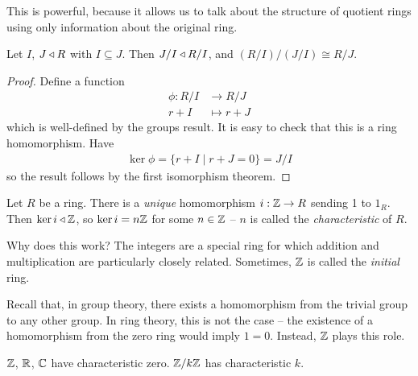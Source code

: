 \documentclass{../template/note}
\begin{document}
    \begin{remark*}
        This is powerful, because it allows us to talk about the structure of quotient rings using only information about the original ring.
    \end{remark*}
    
    \begin{theorem}
        Let $I$, $J \triangleleft R$ with $I \subseteq J$. Then $J/I \triangleleft R/I$, and $(R/I)/(J/I) \cong R/J$.
    \end{theorem}

    \begin{proof}
        Define a function
        \begin{align*}
            \phi: R/I &\to R/J \\
            r+I &\mapsto r+J
        \end{align*}
        which is well-defined by the groups result. It is easy to check that this is a ring homomorphism. Have
        \begin{align*}
            \ker \phi = \{r + I \mid r + J = 0\} = J/I
        \end{align*}
        so the result follows by the first isomorphism theorem.
    \end{proof}
    
    \begin{proposition}
        Let $R$ be a ring. There is a \emph{unique} homomorphism $i: \mathbb Z \to R$ sending 1 to $1_R$. Then $\ker i \triangleleft \mathbb Z$, so $\ker i = n\mathbb Z$ for some $n \in \mathbb Z$ -- $n$ is called the \emph{characteristic} of $R$.
    \end{proposition}
    
    \begin{remark*}
        Why does this work? The integers are a special ring for which addition and multiplication are particularly closely related. Sometimes, $\mathbb Z$ is called the \emph{initial} ring.

        Recall that, in group theory, there exists a homomorphism from the trivial group to any other group. In ring theory, this is not the case -- the existence of a homomorphism from the zero ring would imply $1=0$. Instead, $\mathbb Z$ plays this role.
    \end{remark*}
    
    \begin{example*}
        $\mathbb Z$, $\mathbb R$, $\mathbb C$ have characteristic zero. $\mathbb Z/k\mathbb Z$ has characteristic $k$.
    \end{example*}
    
\end{document}
